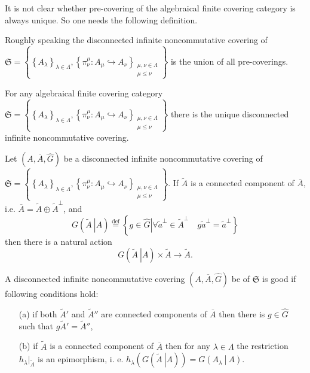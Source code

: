 \documentclass{beamer}
\theoremstyle{plain}
\newcommand{\be}{\begin{equation}}
\newcommand{\ee}{\end{equation}}
\newcommand{\la}{\lambda}
\newcommand{\La}{\Lambda}
\newcommand{\bydef}{\stackrel{\mathrm{def}}{=}}
\newcommand{\hookto}{\hookrightarrow}        %
\begin{document}
\begin{frame}
	It is not clear whether pre-covering of the algebraical finite covering category is always unique. So one needs the following definition.
\begin{definition}\label{disconnected_infinite_noncommutative_covering_defn}
Roughly speaking the  \alert{disconnected infinite noncommutative covering} of $\mathfrak{S}=\left\{\left\{A_\la\right\}_{\la\in \La}, \left\{\pi^\mu_\nu : A_\mu \hookto A_\nu\right\}_{\substack{\mu, \nu \in \La\\\mu \le \nu}}\right\}$ is the union of all pre-coverings.

\end{definition}
\begin{theorem}\label{uni_dicsonnected_lem}
	For any algebraical finite covering category
$\mathfrak{S}=\left\{\left\{A_\la\right\}_{\la\in \La}, \left\{\pi^\mu_\nu : A_\mu \hookto A_\nu\right\}_{\substack{\mu, \nu \in \La\\\mu \le \nu}}\right\}$ there is the unique disconnected infinite noncommutative covering.
\end{theorem}
\end{frame}
\begin{frame}
		Let	 $\left(A, \overline{A},\widehat{G} \right)$ be a  disconnected infinite noncommutative covering of $\mathfrak{S}=\left\{\left\{A_\la\right\}_{\la\in \La}, \left\{\pi^\mu_\nu : A_\mu \hookto A_\nu\right\}_{\substack{\mu, \nu \in \La\\\mu \le \nu}}\right\}$. If $\widetilde A$ is a connected component  of $\overline{A}$, i.e. $\overline{A} = \widetilde A \oplus \widetilde A^\perp$, and
	\be\label{infinite_covering_transformation_group_eqn}
	G\left(\left.\widetilde{A}~\right| A\right)\bydef 
	\left\{\left. g \in \widehat{G}\right| \forall \widetilde a^\perp \in \widetilde A^\perp \quad g \widetilde a^\perp= \widetilde a^\perp\right\}
	\ee
	then there is a natural action
	\be\label{gta_act_eqn} 
	G\left(\left.\widetilde{A}~\right| A\right)\times \widetilde{A} \to \widetilde{A}.
	\ee
	\begin{definition}\label{good_defn}
		A  disconnected infinite noncommutative covering 	$\left(A, \overline{A},\widehat{G}\right)$ be of $\mathfrak{S}$  is \alert{good} if  following conditions hold:
		\begin{enumerate}
			\item[(a)] if both $\widetilde{A}'$ and $\widetilde{A}''$ are  {connected components} of $\overline A$ then there is  $g \in \widehat{G}$ such that $g \widetilde{A}'= \widetilde{A}''$,
			\item [(b)] if $\widetilde A$ is a   connected component of $\overline{A}$  then for any $\la \in \La$ the restriction $h_\la|_{\widetilde A}$ is an epimorphism, i. e. $h_\la\left(G\left(\left.\widetilde{A}~\right| A\right) \right) = G\left(\left. A_\la~\right|~A \right)$.
		\end{enumerate}
	\end{definition}

	\end{frame}
\end{document}
